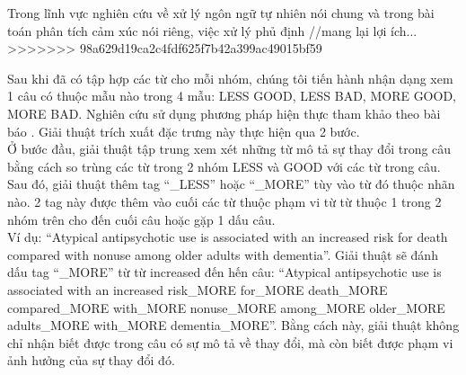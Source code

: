 Trong lĩnh vực nghiên cứu về xử lý ngôn ngữ tự nhiên nói chung và trong bài toán phân tích cảm xúc nói riêng, việc xử lý phủ định //mang lại lợi ích... \\
>>>>>>> 98a629d19ca2c4fdf625f7b42a399ac49015bf59

Sau khi đã có tập hợp các từ cho mỗi nhóm, chúng tôi tiến hành nhận dạng xem 1 câu có thuộc mẫu nào trong 4 mẫu: LESS GOOD, LESS BAD, MORE GOOD, MORE BAD. Nghiên cứu sử dụng phương pháp hiện thực tham khảo theo bài báo \cite{niu2005analysis}. Giải thuật trích xuất đặc trưng này thực hiện qua 2 bước.\\

Ở bước đầu, giải thuật tập trung xem xét những từ mô tả sự thay đổi trong câu bằng cách so trùng các từ trong 2 nhóm LESS và GOOD với các từ trong câu. Sau đó, giải thuật thêm tag ``\_LESS'' hoặc ``\_MORE'' tùy vào từ đó thuộc nhãn nào. 2 tag này được thêm vào cuối các từ thuộc phạm vi từ từ thuộc 1 trong 2 nhóm trên cho đến cuối câu hoặc gặp 1 dấu câu. \\

Ví dụ: “Atypical antipsychotic use is associated with an increased risk for death compared with nonuse among older adults with dementia”. Giải thuật sẽ đánh dấu tag ``\_MORE'' từ từ increased đến hến câu: ``Atypical antipsychotic use is associated with an increased risk\_MORE for\_MORE death\_MORE compared\_MORE with\_MORE nonuse\_MORE among\_MORE older\_MORE adults\_MORE with\_MORE dementia\_MORE''. Bằng cách này, giải thuật không chỉ nhận biết được trong câu có sự mô tả về thay đổi, mà còn biết được phạm vi ảnh hưởng của sự thay đổi đó.

\cite{liu2012sentiment}\cite{marsland2015machine}\cite{Giachanou2016}\cite{ali2013can}\cite{taboada2011lexicon}\cite{niu2006using}\cite{ohana2009sentiment}